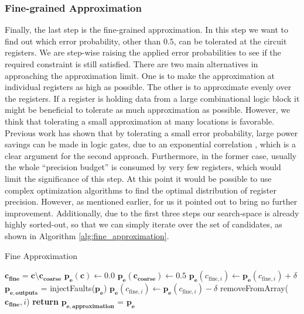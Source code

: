 \documentclass[conference]{IEEEtran}
\begin{document}
\subsubsection{Fine-grained Approximation}
Finally, the last step is the fine-grained approximation. In this step we want to find out which error probability, other than $0.5$, can be tolerated at the circuit registers. We are step-wise raising the applied error probabilities to see if the required constraint is still satisfied. There are two main alternatives in approaching the approximation limit. One is to make the approximation at individual registers as high as possible. The other is to approximate evenly over the registers. If a register is holding data from a large combinational logic block it might be beneficial to tolerate as much approximation as possible. However, we think that tolerating a small approximation at many locations is favorable. Previous work has shown that by tolerating a small error probability, large power savings can be made in logic gates, due to an exponential correlation \cite{korkmaz2006advocating}, which is a clear argument for the second approach. Furthermore, in the former case, usually the whole ``precision budget'' is consumed by very few registers, which would limit the significance of this step. At this point it would be possible to use complex optimization algorithms to find the optimal distribution of register precision. However, as mentioned earlier, for us it pointed out to bring no further improvement. Additionally, due to the first three steps our search-space is already highly sorted-out, so that we can simply iterate over the set of candidates, as shown in Algorithm \ref{alg:fine_approximation}. 
\begin{algorithm}
  \caption{Fine Approximation}\label{alg:fine_approximation}
  \begin{algorithmic}[1]
    \State $\mathbf{c_{fine}} = \mathbf{c} \setminus \mathbf{c_{coarse}}$
    \State $\mathbf{p_e}(\mathbf{c}) \gets 0.0$
    \State $\mathbf{p_e}(\mathbf{c_{coarse}}) \gets 0.5$
    \State $\mathbf{p_e}(c_{\textrm{fine},i}) \gets \mathbf{p_e}(c_{\textrm{fine},i}) + \delta$
    \State $\mathbf{p_{e,outputs}}$ = injectFaults($\mathbf{p_e}$)
    \State $\mathbf{p_e}(c_{\textrm{fine},i}) \gets \mathbf{p_e}(c_{\textrm{fine},i}) - \delta$
    \State removeFromArray($\mathbf{c_{fine}},i$)
    \EndIf
    \EndFor
    \EndWhile
    \State \textbf{return} $\mathbf{p_{e,approximation}}$ = $\mathbf{p_e}$
    \EndProcedure
  \end{algorithmic}
\end{algorithm}
\end{document}
